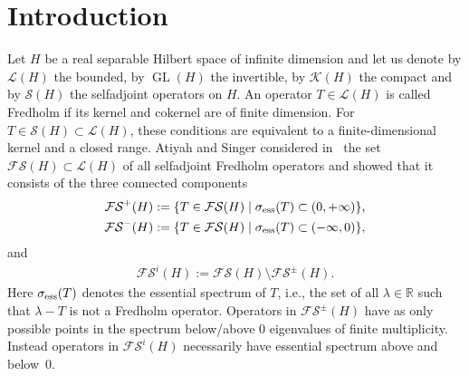 \documentclass[pdftex]{sigma}
\numberwithin{equation}{section}
\theoremstyle{definition}
\DeclareMathOperator{\GL}{GL}
\begin{document}


\renewcommand{\thefootnote}{\arabic{footnote}}
\setcounter{footnote}{0}

\section{Introduction}

Let $H$ be a real separable Hilbert space of infinite dimension and let us denote by $\mathcal{L}(H)$ the bounded, by $\GL(H)$ the invertible, by $\mathcal{K}(H)$ the compact and by $\mathcal{S}(H)$ the selfadjoint operators on $H$. An operator $T\in\mathcal{L}(H)$ is called Fredholm if its kernel and cokernel are of finite dimension. For $T\in\mathcal{S}(H)\subset\mathcal{L}(H)$, these conditions are equivalent to a finite-dimensional kernel and a closed range. Atiyah and Singer considered in~\cite{AtiyahSinger} the set $\mathcal{FS}(H)\subset\mathcal{L}(H)$ of all selfadjoint Fredholm operators and showed that it consists of the three connected components
\begin{align*}
\mathcal{FS}^+(H)&:=\{T\in\mathcal{FS}(H)\mid \sigma_{\rm ess}(T)\subset(0,+\infty)\},\\
\mathcal{FS}^-(H)&:=\{T\in\mathcal{FS}(H)\mid \sigma_{\rm ess}(T)\subset(-\infty,0)\},
\end{align*}
and
\begin{align*}
\mathcal{FS}^i(H):=\mathcal{FS}(H)\setminus\mathcal{FS}^\pm(H).
\end{align*}
Here $\sigma_{\rm ess}(T)$ denotes the essential spectrum of $T$, i.e., the set of all $\lambda\in\mathbb{R}$ such that $\lambda-T$ is not a Fredholm operator. Operators in $\mathcal{FS}^\pm(H)$ have as only possible points in the spectrum below/above $0$ eigenvalues of finite multiplicity. Instead operators in $\mathcal{FS}^i(H)$ necessarily have essential spectrum above and below~$0$.
\end{document}
